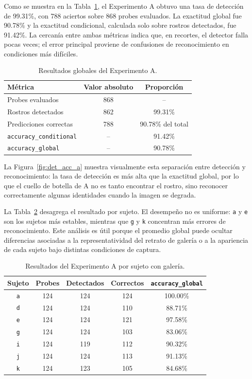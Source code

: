 \documentclass[11pt]{article}
\begin{document}
Como se muestra en la Tabla~\ref{tab:exp_a_global}, el Experimento A obtuvo una tasa de detección de 99.31\%, con 788 aciertos sobre 868 probes evaluados. La exactitud global fue 90.78\% y la exactitud condicional, calculada solo sobre rostros detectados, fue 91.42\%. La cercanía entre ambas métricas indica que, en recortes, el detector falla pocas veces; el error principal proviene de confusiones de reconocimiento en condiciones más difíciles.

\begin{table}[H]
\centering
\caption{Resultados globales del Experimento A.}
\label{tab:exp_a_global}
\begin{tabular}{lcc}
\toprule
Métrica & Valor absoluto & Proporción \\
\midrule
Probes evaluados & 868 & -- \\
Rostros detectados & 862 & 99.31\% \\
Predicciones correctas & 788 & 90.78\% del total \\
\texttt{accuracy\_conditional} & -- & 91.42\% \\
\texttt{accuracy\_global} & -- & 90.78\% \\
\bottomrule
\end{tabular}
\end{table}

La Figura~\ref{fig:det_acc_a} muestra visualmente esta separación entre detección y reconocimiento: la tasa de detección es más alta que la exactitud global, por lo que el cuello de botella de A no es tanto encontrar el rostro, sino reconocer correctamente algunas identidades cuando la imagen se degrada.

La Tabla~\ref{tab:exp_a_sujeto} desagrega el resultado por sujeto. El desempeño no es uniforme: \texttt{a} y \texttt{e} son los sujetos más estables, mientras que \texttt{g} y \texttt{k} concentran más errores de reconocimiento. Este análisis es útil porque el promedio global puede ocultar diferencias asociadas a la representatividad del retrato de galería o a la apariencia de cada sujeto bajo distintas condiciones de captura.

\begin{table}[H]
\centering
\caption{Resultados del Experimento A por sujeto con galería.}
\label{tab:exp_a_sujeto}
\begin{tabular}{ccccc}
\toprule
Sujeto & Probes & Detectados & Correctos & \texttt{accuracy\_global} \\
\midrule
\texttt{a} & 124 & 124 & 124 & 100.00\% \\
\texttt{d} & 124 & 124 & 110 & 88.71\% \\
\texttt{e} & 124 & 124 & 121 & 97.58\% \\
\texttt{g} & 124 & 124 & 103 & 83.06\% \\
\texttt{i} & 124 & 119 & 112 & 90.32\% \\
\texttt{j} & 124 & 124 & 113 & 91.13\% \\
\texttt{k} & 124 & 123 & 105 & 84.68\% \\
\bottomrule
\end{tabular}
\end{table}
\end{document}
